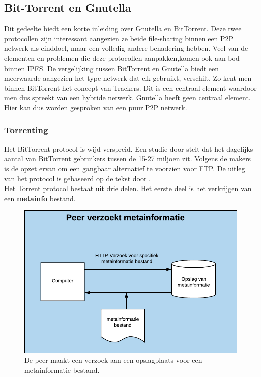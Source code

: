 \subsection{Bit-Torrent en Gnutella}
Dit gedeelte biedt een korte inleiding over Gnutella en BitTorrent. Deze twee protocollen zijn interessant aangezien ze beide file-sharing binnen een P2P netwerk als einddoel, maar een volledig andere benadering hebben. Veel van de elementen en problemen die deze protocollen aanpakken,komen ook aan bod binnen IPFS. De vergelijking tussen BitTorrent en Gnutella biedt een meerwaarde aangezien het type netwerk dat elk gebruikt, verschilt. Zo kent men binnen BitTorrent het concept van Trackers. Dit is een centraal element waardoor men dus spreekt van een hybride netwerk. Gnutella heeft geen centraal element. Hier kan dus worden gesproken van een puur P2P netwerk.\\

 
 \subsubsection{Torrenting}
 \label{torrenting}
Het BitTorrent protocol is wijd verspreid. Een studie door \textcite{Wang2013} stelt dat het dagelijks aantal van BitTorrent gebruikers tussen de 15-27 miljoen zit. Volgens de makers is de opzet ervan om een gangbaar alternatief te voorzien voor FTP. De uitleg van het protocol is gebaseerd op de tekst door \textcite{Fonseca2005}.\\ 

Het Torrent protocol bestaat uit drie delen. Het eerste deel is het verkrijgen van een \textbf{metainfo} bestand.\\

\begin{figure}[h!]
\centering
\includegraphics[scale=.4]{torrent-1.png}
\caption[Peer metainformatie stap  - Torrenting 1]{De peer maakt een verzoek aan een opslagplaats voor een metainformatie bestand.}
\end{figure}

